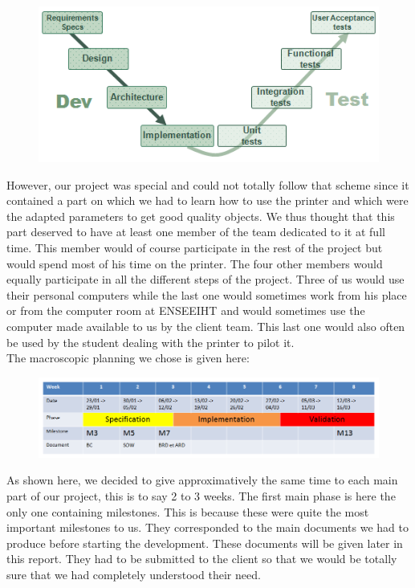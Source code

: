 \documentclass{report}
\begin{document}
\begin{figure}[!h]
\begin{center}
	\includegraphics[scale=4.5]{VCycle}
\end{center}
\end{figure}

However, our project was special and could not totally follow that scheme since it contained a part on which we had to learn how to use the printer and which were the adapted parameters to get good quality objects. We thus thought that this part deserved to have at least one member of the team dedicated to it at full time. This member would of course participate in the rest of the project but would spend most of his time on the printer. The four other members would equally participate in all the different steps of the project. Three of us would use their personal computers while the last one would sometimes work from his place or from the computer room at ENSEEIHT and would sometimes use the computer made available to us by the client team. This last one would also often be used by the student dealing with the printer to pilot it.\\

The macroscopic planning we chose is given here:

\bigskip
\begin{figure}[!h]
\begin{center}
	\includegraphics[scale=0.4]{PlanningMacroscopique}
\end{center}
\end{figure}

As shown here, we decided to give approximatively the same time to each main part of our project, this is to say 2 to 3 weeks. The first main phase is here the only one containing milestones. This is because these were quite the most important milestones to us. They corresponded to the main documents we had to produce before starting the development. These documents will be given later in this report. They had to be submitted to the client so that we would be totally sure that we had completely understood their need.\\
\end{document}
